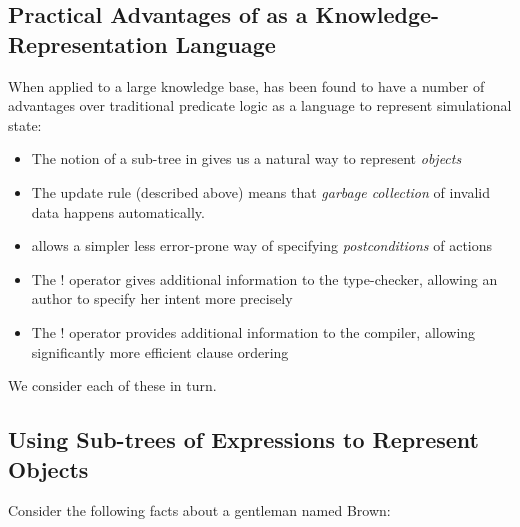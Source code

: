 \subsection{Practical Advantages of \ELABR{} as a Knowledge-Representation Language}

\NI When applied to a large knowledge base, \ELFULL{} has been found
to have a number of advantages over traditional predicate logic as a
language to represent simulational state:
\begin{itemize}

\item The notion of a sub-tree in \ELABR{} gives us a natural way to
  represent \emph{objects}

\item The update rule (described above) means that \emph{garbage
  collection} of invalid data happens
  automatically.

\item \ELABR{} allows a simpler less error-prone way of specifying
  \emph{postconditions} of actions

\item The $!$ operator gives additional information to the type-checker,
allowing an author to specify her intent more precisely

\item The $!$ operator provides additional information to the
  compiler, allowing significantly more efficient clause ordering

\end{itemize}
We consider  each of these in turn.

\subsection{Using Sub-trees of Expressions to Represent Objects}


\NI Consider the following facts about a gentleman named Brown:

